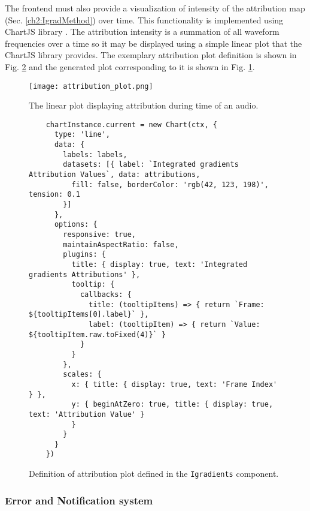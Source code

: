 \documentclass[
    bindingoffset=5mm,  %
    footnoteindent=3mm, %
    hyphenation=true    %
]{src/wut-thesis}
\begin{document}

The frontend must also provide a visualization of intensity of the attribution map
(Sec. \ref{ch2:IgradMethod}) over time.
This functionality is implemented using ChartJS library \cite{ChartJsDoc}.
The attribution intensity is a summation of all waveform frequencies over a time so it may
be displayed using a simple linear plot that the ChartJS library provides.
The exemplary attribution plot definition is shown in Fig. \ref{fig:IgradientsAttrPlot}
and the generated plot corresponding to it is shown in Fig. \ref{fig:AttrPlot}.

\begin{figure}[h!] %
    \centering
    \texttt{[image: attribution\_plot.png]}
    \caption{The linear plot displaying attribution during time of an audio.}
    \label{fig:AttrPlot}
\end{figure}

\begin{figure}%
\begin{verbatim}
    chartInstance.current = new Chart(ctx, {
      type: 'line',
      data: {
        labels: labels,
        datasets: [{ label: `Integrated gradients Attribution Values`, data: attributions,
          fill: false, borderColor: 'rgb(42, 123, 198)', tension: 0.1
        }]
      },
      options: {
        responsive: true,
        maintainAspectRatio: false,
        plugins: {
          title: { display: true, text: 'Integrated gradients Attributions' },
          tooltip: {
            callbacks: {
              title: (tooltipItems) => { return `Frame: ${tooltipItems[0].label}` },
              label: (tooltipItem) => { return `Value: ${tooltipItem.raw.toFixed(4)}` }
            }
          }
        },
        scales: {
          x: { title: { display: true, text: 'Frame Index' } },
          y: { beginAtZero: true, title: { display: true, text: 'Attribution Value' }
          }
        }
      }
    })
\end{verbatim}
\caption{Definition of attribution plot defined in the \texttt{Igradients} component.}
\label{fig:IgradientsAttrPlot}
\end{figure}

\subsubsection{Error and Notification system}
\end{document}
